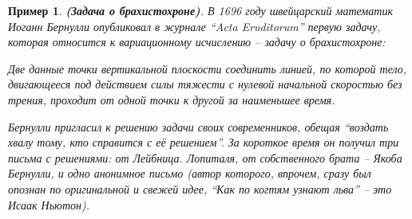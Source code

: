 \documentclass[12pt,a4paper]{article}
\newtheorem{ex}{Пример}
\begin{document}
\begin{ex}\label{ex.brakhist}\textbf{(Задача о брахистохроне)}.
{\em В 1696 году швейцарский математик
Иоганн Бернулли опубликовал в журнале ``Acta Eruditorum'' первую
задачу, которая относится к вариационному исчислению -- задачу о
брахистохроне:}

Две данные точки вертикальной плоскости соединить линией, по
которой тело, двигающееся под действием силы тяжести с нулевой
начальной скоростью без трения, проходит от одной точки к другой
за наименьшее время.
\smallskip 

{\em Бернулли пригласил к решению задачи своих современников,  обещая
 ``воздать хвалу тому,  кто справится с её решением''. За короткое время он получил три письма с решениями:
 от Лейбница. Лопиталя, от собственного брата -- Якоба Бернулли, и одно анонимное письмо
 (автор которого, впрочем, сразу был опознан по оригинальной  и свежей идее,
 ``Как по когтям узнают льва'' -- это Исаак Ньютон). }
\smallskip 


\end{ex}
\end{document}
